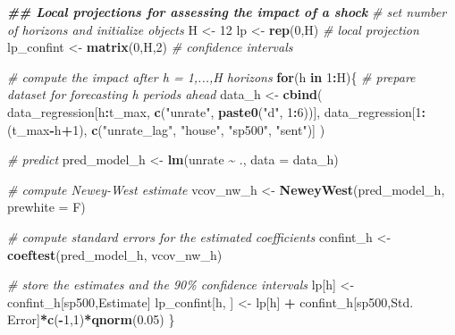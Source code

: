 \documentclass[
]{book}
\newenvironment{Shaded}{\begin{snugshade}}{\end{snugshade}}
\newcommand{\AttributeTok}[1]{\textcolor[rgb]{0.13,0.29,0.53}{#1}}
\newcommand{\CommentTok}[1]{\textcolor[rgb]{0.56,0.35,0.01}{\textit{#1}}}
\newcommand{\ControlFlowTok}[1]{\textcolor[rgb]{0.13,0.29,0.53}{\textbf{#1}}}
\newcommand{\DecValTok}[1]{\textcolor[rgb]{0.00,0.00,0.81}{#1}}
\newcommand{\DocumentationTok}[1]{\textcolor[rgb]{0.56,0.35,0.01}{\textbf{\textit{#1}}}}
\newcommand{\FloatTok}[1]{\textcolor[rgb]{0.00,0.00,0.81}{#1}}
\newcommand{\FunctionTok}[1]{\textcolor[rgb]{0.13,0.29,0.53}{\textbf{#1}}}
\newcommand{\NormalTok}[1]{#1}
\newcommand{\OtherTok}[1]{\textcolor[rgb]{0.56,0.35,0.01}{#1}}
\newcommand{\SpecialCharTok}[1]{\textcolor[rgb]{0.81,0.36,0.00}{\textbf{#1}}}
\newcommand{\StringTok}[1]{\textcolor[rgb]{0.31,0.60,0.02}{#1}}
\begin{document}
\begin{Shaded}
\begin{Highlighting}[]
\DocumentationTok{\#\# Local projections for assessing the impact of a shock}
\CommentTok{\# set number of horizons and initialize objects}
\NormalTok{H          }\OtherTok{\textless{}{-}} \DecValTok{12}
\NormalTok{lp         }\OtherTok{\textless{}{-}} \FunctionTok{rep}\NormalTok{(}\DecValTok{0}\NormalTok{,H)      }\CommentTok{\# local projection}
\NormalTok{lp\_confint }\OtherTok{\textless{}{-}} \FunctionTok{matrix}\NormalTok{(}\DecValTok{0}\NormalTok{,H,}\DecValTok{2}\NormalTok{) }\CommentTok{\# confidence intervals}

\CommentTok{\# compute the impact after h = 1,...,H horizons}
\ControlFlowTok{for}\NormalTok{(h }\ControlFlowTok{in} \DecValTok{1}\SpecialCharTok{:}\NormalTok{H)\{}
  \CommentTok{\# prepare dataset for forecasting h periods ahead}
\NormalTok{  data\_h  }\OtherTok{\textless{}{-}} \FunctionTok{cbind}\NormalTok{( }
\NormalTok{    data\_regression[h}\SpecialCharTok{:}\NormalTok{t\_max, }\FunctionTok{c}\NormalTok{(}\StringTok{"unrate"}\NormalTok{, }\FunctionTok{paste0}\NormalTok{(}\StringTok{"d"}\NormalTok{, }\DecValTok{1}\SpecialCharTok{:}\DecValTok{6}\NormalTok{))],}
\NormalTok{    data\_regression[}\DecValTok{1}\SpecialCharTok{:}\NormalTok{(t\_max}\SpecialCharTok{{-}}\NormalTok{h}\SpecialCharTok{+}\DecValTok{1}\NormalTok{), }\FunctionTok{c}\NormalTok{(}\StringTok{"unrate\_lag"}\NormalTok{, }\StringTok{"house"}\NormalTok{, }\StringTok{"sp500"}\NormalTok{, }\StringTok{"sent"}\NormalTok{)]}
\NormalTok{    )}

  \CommentTok{\# predict}
\NormalTok{  pred\_model\_h }\OtherTok{\textless{}{-}} \FunctionTok{lm}\NormalTok{(unrate }\SpecialCharTok{\textasciitilde{}}\NormalTok{ ., }\AttributeTok{data =}\NormalTok{ data\_h)}

  \CommentTok{\# compute Newey{-}West estimate}
\NormalTok{  vcov\_nw\_h }\OtherTok{\textless{}{-}} \FunctionTok{NeweyWest}\NormalTok{(pred\_model\_h, }\AttributeTok{prewhite =}\NormalTok{ F)}

  \CommentTok{\# compute standard errors for the estimated coefficients}
\NormalTok{  confint\_h }\OtherTok{\textless{}{-}} \FunctionTok{coeftest}\NormalTok{(pred\_model\_h, vcov\_nw\_h)}

  \CommentTok{\# store the estimates and the 90\% confidence intervals}
\NormalTok{  lp[h]           }\OtherTok{\textless{}{-}}\NormalTok{ confint\_h[}\StringTok{\textquotesingle{}sp500\textquotesingle{}}\NormalTok{,}\StringTok{\textquotesingle{}Estimate\textquotesingle{}}\NormalTok{]}
\NormalTok{  lp\_confint[h, ] }\OtherTok{\textless{}{-}}\NormalTok{ lp[h] }\SpecialCharTok{+}\NormalTok{ confint\_h[}\StringTok{\textquotesingle{}sp500\textquotesingle{}}\NormalTok{,}\StringTok{\textquotesingle{}Std. Error\textquotesingle{}}\NormalTok{]}\SpecialCharTok{*}\FunctionTok{c}\NormalTok{(}\SpecialCharTok{{-}}\DecValTok{1}\NormalTok{,}\DecValTok{1}\NormalTok{)}\SpecialCharTok{*}\FunctionTok{qnorm}\NormalTok{(}\FloatTok{0.05}\NormalTok{)}
\NormalTok{\}}
\end{Highlighting}
\end{Shaded}
\end{document}
